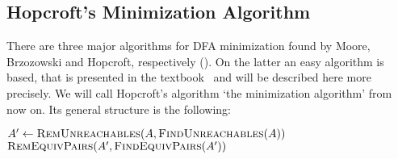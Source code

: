 \subsection{Hopcroft's Minimization Algorithm}

There are three major algorithms for DFA minimization found by Moore, Brzozowski and Hopcroft, respectively (\cite[p. 2]{BBC10}). On the latter an easy algorithm is based, that is presented in the textbook~\cite{HMU01} and will be described here more precisely. We will call Hopcroft's algorithm `the minimization algorithm' from now on. Its general structure is the following:
\vspace{0.2cm}
\begin{algorithmic}[1] \label{ch:2:minalg}
	\State $A' \gets \textsc{RemUnreachables}(A, \textsc{FindUnreachables}(A))$
	\State \Return $\textsc{RemEquivPairs}(A', \textsc{FindEquivPairs}(A'))$
	\EndFunction
\end{algorithmic}
\vspace{0.2cm}

